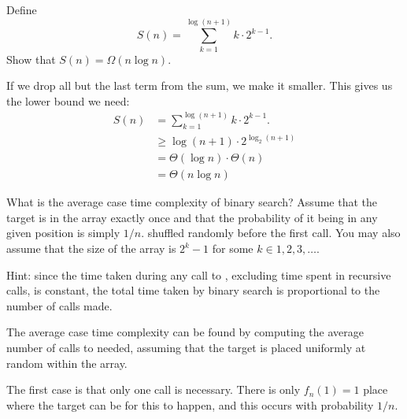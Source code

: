 \begin{prob}
\begin{subprobset}
        \begin{subprob}
            Define
            \[
                S(n) = \sum_{k=1}^{\log (n+1)} k \cdot 2^{k-1}.
            \]
            Show that $S(n) = \Omega(n \log n)$.

            \begin{soln}
                If we drop all but the last term from the sum, we make it smaller. This
                gives us the lower bound we need:
                \begin{align*}
                    S(n)
                    &=
                        \sum_{k=1}^{\log (n+1)} k \cdot 2^{k-1}.
                        \\
                    &\geq
                        \log(n+1) \cdot 2^{\log_2(n+1)}
                        \\
                    &=
                        \Theta(\log n) \cdot \Theta(n)
                        \\
                    &=
                        \Theta(n \log n)
                \end{align*}
            \end{soln}
        \end{subprob}

        \begin{subprob}
            What is the average case time complexity of binary search? Assume that the
            target is in the array exactly once and that the probability of it being in
            any given position is simply $1/n$.
            shuffled randomly before the first call. You may also assume that the size
            of the array is $2^k - 1$ for some $k \in {1,2,3,\ldots}$.

            Hint: since the time taken during any call to
            , excluding time spent in recursive calls, is constant,
            the total time taken by binary search is proportional to the number of calls
            made.

            \begin{soln}
                The average case time complexity can be found by computing the average
                number of calls to  needed, assuming that the target
                is placed uniformly at random within the array.

                The first case is that only one call is necessary. There is only 
                $f_n(1) = 1$ place where the target can be for this to happen, and this
                occurs with probability $1/n$.


\end{soln}
\end{subprob}
\end{subprobset}
\end{prob}
